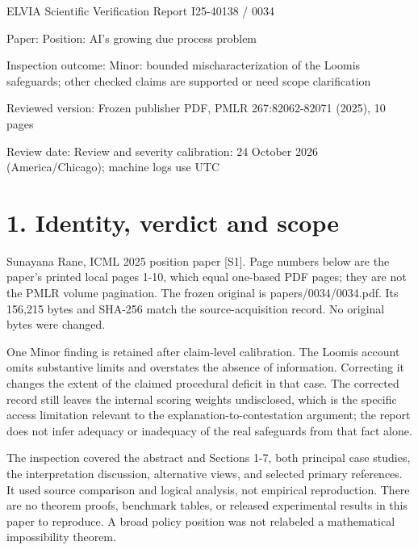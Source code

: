\documentclass[10pt]{article}
\begin{document}
ELVIA Scientific Verification Report
I25-40138 / 0034\par
Paper: Position: AI’s growing due process problem\par
Inspection outcome: Minor: bounded mischaracterization of the Loomis safeguards; other checked claims are supported or need scope clarification\par
Reviewed version: Frozen publisher PDF, PMLR 267:82062-82071 (2025), 10 pages\par
Review date: Review and severity calibration: 24 October 2026 (America/Chicago); machine logs use UTC\par
\section*{1. Identity, verdict and scope}
Sunayana Rane, ICML 2025 position paper [S1]. Page numbers below are the paper’s printed local pages 1-10, which equal one-based PDF pages; they are not the PMLR volume pagination. The frozen original is papers/0034/0034.pdf. Its 156,215 bytes and SHA-256 match the source-acquisition record. No original bytes were changed.\par
One Minor finding is retained after claim-level calibration. The Loomis account omits substantive limits and overstates the absence of information. Correcting it changes the extent of the claimed procedural deficit in that case. The corrected record still leaves the internal scoring weights undisclosed, which is the specific access limitation relevant to the explanation-to-contestation argument; the report does not infer adequacy or inadequacy of the real safeguards from that fact alone.\par
The inspection covered the abstract and Sections 1-7, both principal case studies, the interpretation discussion, alternative views, and selected primary references. It used source comparison and logical analysis, not empirical reproduction. There are no theorem proofs, benchmark tables, or released experimental results in this paper to reproduce. A broad policy position was not relabeled a mathematical impossibility theorem.\par
\end{document}

